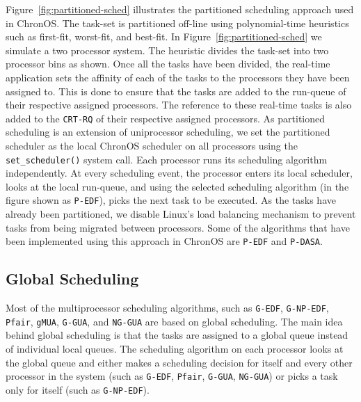 \documentclass[12pt,dvips]{report}
\begin{document}

Figure~\ref{fig:partitioned-sched} illustrates the partitioned scheduling approach used in ChronOS. The task-set is partitioned off-line using polynomial-time heuristics such as first-fit, worst-fit, and best-fit. In Figure~\ref{fig:partitioned-sched} we simulate a two processor system. The heuristic divides the task-set into two processor bins as shown. Once all the tasks have been divided, the real-time application sets the affinity of each of the tasks to the processors they have been assigned to. This is done to ensure that the tasks are added to the run-queue of their respective assigned processors. The reference to these real-time tasks is also added to the \texttt{CRT-RQ} of their respective assigned processors. As partitioned scheduling is an extension of uniprocessor scheduling, we set the partitioned scheduler as the local ChronOS scheduler on all processors using the \texttt{set\_scheduler()} system call. Each processor runs its scheduling algorithm independently. At every scheduling event, the processor enters its local scheduler, looks at the local run-queue, and using the selected scheduling algorithm (in the figure shown as \texttt{P-EDF}), picks the next task to be executed. As the tasks have already been partitioned, we disable Linux's load balancing mechanism to prevent tasks from being migrated between processors. Some of the algorithms that have been implemented using this approach in ChronOS are \texttt{P-EDF} and \texttt{P-DASA}.

\subsection{Global Scheduling}

Most of the multiprocessor scheduling algorithms, such as \texttt{G-EDF}, \texttt{G-NP-EDF}, \texttt{Pfair}, \texttt{gMUA}, \texttt{G-GUA}, and \texttt{NG-GUA} are based on global scheduling. The main idea behind global scheduling is that the tasks are assigned to a global queue instead of individual local queues. The scheduling algorithm on each processor looks at the global queue and either makes a scheduling decision for itself and every other processor in the system (such as \texttt{G-EDF}, \texttt{Pfair}, \texttt{G-GUA}, \texttt{NG-GUA}) or picks a task only for itself (such as \texttt{G-NP-EDF}).
\end{document}
